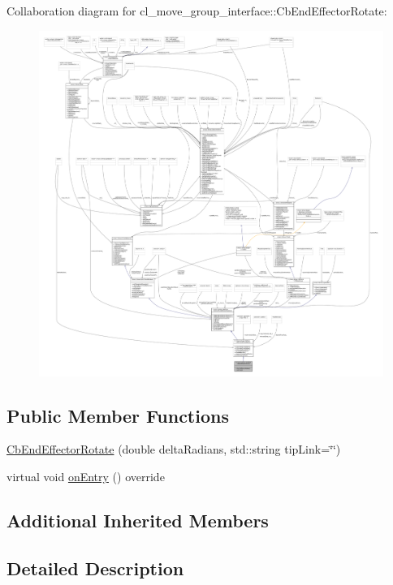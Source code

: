 Collaboration diagram for cl\+\_\+move\+\_\+group\+\_\+interface\+:\+:Cb\+End\+Effector\+Rotate\+:
\nopagebreak
\begin{figure}[H]
\begin{center}
\leavevmode
\includegraphics[width=350pt]{classcl__move__group__interface_1_1CbEndEffectorRotate__coll__graph}
\end{center}
\end{figure}
\subsection*{Public Member Functions}
\begin{DoxyCompactItemize}
\item 
\hyperlink{classcl__move__group__interface_1_1CbEndEffectorRotate_a5a3f91fcbb0196baeaae40c4c38a59e8}{Cb\+End\+Effector\+Rotate} (double delta\+Radians, std\+::string tip\+Link=\char`\"{}\char`\"{})
\item 
virtual void \hyperlink{classcl__move__group__interface_1_1CbEndEffectorRotate_a3e60bfba48906696587d66af89f7ee2b}{on\+Entry} () override
\end{DoxyCompactItemize}
\subsection*{Additional Inherited Members}


\subsection{Detailed Description}


